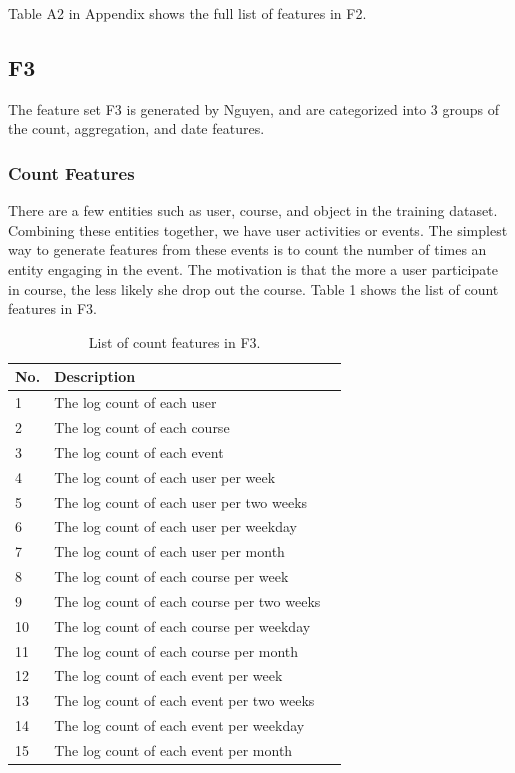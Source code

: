 Table A2 in Appendix shows the full list of features in F2.

\subsection{F3}
The feature set F3 is generated by Nguyen, and are categorized into 3 groups of the count, aggregation, and date features.

\subsubsection{Count Features}
There are a few entities such as user, course, and object in the training dataset.  Combining these entities together, we have user activities or events.  The simplest way to generate features from these events is to count the number of times an entity engaging in the event. The motivation is that the more a user participate in course, the less likely she drop out the course. Table 1 shows the list of count features in F3. 

\begin{center}
	\begin{table}[ht]
		\begin{minipage}{0.5 \textwidth}
			{
				\caption{List of count features in F3.}
				\small
				\hfill{}
				\begin{tabular}{|l|l|l|}
					\hline
					\textbf{No.}	&\textbf{Description}\tabularnewline \hline
					1 			& The log count of each user \tabularnewline
					2 			& The log count of each course \tabularnewline
					3			& The log count of each event \tabularnewline
					4 			& The log count of each user per week \tabularnewline
					5 			& The log count of each user per two weeks \tabularnewline
					6 			& The log count of each user per weekday \tabularnewline
					7 			& The log count of each user per month\tabularnewline
					8 			& The log count of each course per week \tabularnewline
					9 			& The log count of each course per two weeks \tabularnewline
					10 			& The log count of each course per weekday\tabularnewline
					11 			& The log count of each course per month \tabularnewline
					12 			& The log count of each event per week \tabularnewline
					13 			& The log count of each event per two weeks \tabularnewline
					14 			& The log count of each event per weekday \tabularnewline
					15 			& The log count of each event per month \tabularnewline
					\hline
				\end{tabular}
			}
			\hfill{}
			\label{tb:tnfeature1}
		\end{minipage}
	\end{table}
\end{center}

